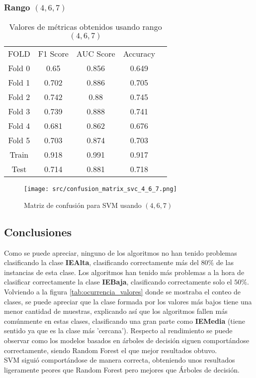 \subsubsection*{Rango $(4,6,7)$}
\begin{table}[H]
	\centering
	\begin{tabular}{|c|c|c|c|c}
		\cline{1-4}
		FOLD   & F1 Score & AUC Score & Accuracy \\ \cline{1-4}
		Fold 0 & 0.65     & 0.856     & 0.649    \\  \cline{1-4}
		Fold 1 & 0.702    & 0.886     & 0.705    \\  \cline{1-4}
		Fold 2 & 0.742    & 0.88      & 0.745    \\  \cline{1-4}
		Fold 3 & 0.739    & 0.888     & 0.741    \\  \cline{1-4}
		Fold 4 & 0.681    & 0.862     & 0.676    \\  \cline{1-4}
		Fold 5 & 0.703    & 0.874     & 0.703    \\  \cline{1-4}
		Train  & 0.918    & 0.991     & 0.917    \\  \cline{1-4}
		Test   & 0.714    & 0.881     & 0.718    \\  \cline{1-4}
	\end{tabular}
	\caption{Valores de métricas obtenidos usando rango $(4,6,7)$}
\end{table}
\begin{figure}[H]
	\centering
	\texttt{[image: src/confusion\_matrix\_svc\_4\_6\_7.png]}
	\caption{Matriz de confusión para SVM usando $(4,6,7)$}
	\label{fig:confusion_matrix_svc2}
\end{figure}

\subsection{Conclusiones}
Como se puede apreciar, ninguno de los algoritmos no han tenido problemas clasificando la clase \textbf{IEAlta}, clasificando correctamente más del $80\%$ de las instancias de esta clase.
Los algoritmos han tenido más problemas a la hora de clasificar correctamente la clase \textbf{IEBaja}, clasificando correctamente solo el $50\%$. Volviendo a la figura \ref{tab:ocurrencia_valores} donde se mostraba el conteo de clases, se puede apreciar que la clase formada por los valores más bajos tiene una menor cantidad de muestras, explicando así que los algoritmos fallen más comúnmente en estas clases, clasificando una gran parte como \textbf{IEMedia} (tiene sentido ya que es la clase más 'cercana').
\linebreak
Respecto al rendimiento se puede observar como los modelos basados en árboles de decisión siguen comportándose correctamente, siendo Random Forest el que mejor resultados obtuvo. \\
SVM siguió comportándose de manera correcta, obteniendo unos resultados ligeramente peores que Random Forest pero mejores que Árboles de decisión.

